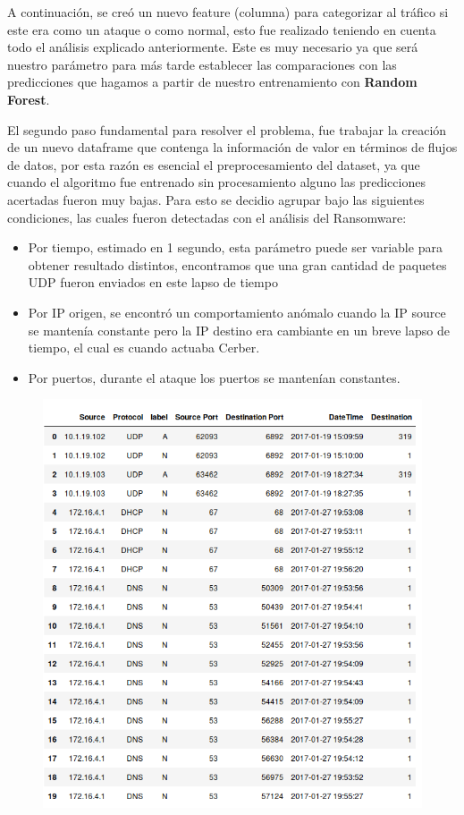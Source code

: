 \documentclass[a4paper,10pt]{article}
\begin{document}
A continuación, se creó un nuevo feature (columna) para categorizar al tráfico si este era como un ataque o como normal, esto fue realizado teniendo en cuenta todo el análisis explicado anteriormente. Este es muy necesario ya que será nuestro parámetro para más tarde establecer las comparaciones con las predicciones que hagamos a partir de nuestro entrenamiento con \textbf{Random Forest}.

\medskip
El segundo paso fundamental para resolver el problema, fue trabajar la creación de un nuevo dataframe que contenga la información de valor en términos de flujos de datos, por esta razón es esencial el preprocesamiento del dataset, ya que cuando el algoritmo fue entrenado sin procesamiento alguno las predicciones acertadas fueron muy bajas. Para esto se decidio agrupar bajo las siguientes condiciones, las cuales fueron detectadas con el análisis del Ransomware:
\begin{itemize}
\item Por tiempo, estimado en 1 segundo, esta parámetro puede ser variable para obtener resultado distintos, encontramos que una gran cantidad de paquetes UDP fueron enviados en este lapso de tiempo 
\item Por IP origen, se encontró un comportamiento anómalo cuando la IP source se mantenía constante pero la IP destino era cambiante en un breve lapso de tiempo, el cual es cuando actuaba Cerber.
\item Por puertos, durante el ataque los puertos se mantenían constantes.
\end{itemize}

\begin{figure}[!htp]
\centering
\includegraphics[scale=0.5]{Wireshark/magicmike.png} 
\caption{}
\end{figure}
\end{document}
